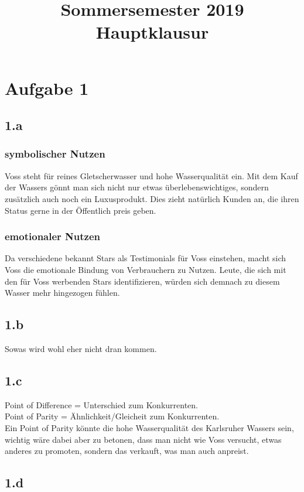 \documentclass{article}
\title{Sommersemester 2019 Hauptklausur}
\begin{document}
\maketitle


\section{Aufgabe 1}
\subsection{1.a}
\subsubsection{symbolischer Nutzen}
Voss steht für reines Gletscherwasser und hohe Wasserqualität ein. Mit dem Kauf der Wassers gönnt man sich nicht nur etwas überlebenswichtiges, sondern zusätzlich auch noch ein Luxusprodukt. Dies zieht natürlich Kunden an, die ihren Status gerne in der Öffentlich preis geben.
\subsubsection{emotionaler Nutzen}
Da verschiedene bekannt Stars als Testimonials für Voss einstehen, macht sich Voss die emotionale Bindung von Verbrauchern zu Nutzen. Leute, die sich mit den für Voss werbenden Stars identifizieren, würden sich demnach zu diesem Wasser mehr hingezogen fühlen.

\subsection{1.b}
Sowas wird wohl eher nicht dran kommen.

\subsection{1.c} 
Point of Difference = Unterschied zum Konkurrenten.\\
Point of Parity = Ähnlichkeit/Gleicheit zum Konkurrenten.\\
Ein Point of Parity könnte die hohe Wasserqualität des Karlsruher Wassers sein, wichtig wäre dabei aber zu betonen, dass man nicht wie Voss versucht, etwas anderes zu promoten, sondern das verkauft, was man auch anpreist.

\subsection{1.d}
\end{document}
